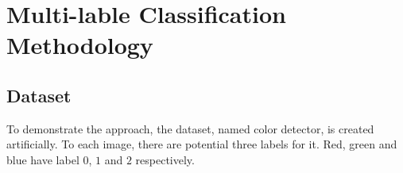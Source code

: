 
\chapter{Multi-lable Classification Methodology} %
\label{Chapter6}

\section{Dataset}

To demonstrate the approach, the dataset, named color detector, is created artificially. To each image, there are potential three labels for it. Red, green and blue have label $0$, $1$ and $2$ respectively.















